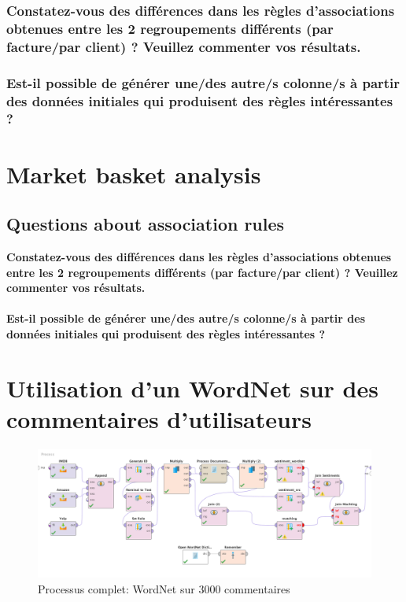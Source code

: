 \documentclass[a4paper]{article}
\begin{document}
\subsubsection*{Constatez-vous des différences dans les règles d'associations obtenues entre les 2 regroupements différents (par facture/par client) ? Veuillez commenter vos résultats.}

\subsubsection*{Est-il possible de générer une/des autre/s colonne/s à partir des données initiales qui produisent des règles intéressantes ?}
\section{Market basket analysis}
\subsection{Questions about association rules}
\textbf{Constatez-vous des différences dans les règles d'associations obtenues entre les 2 regroupements différents (par facture/par client) ? Veuillez commenter vos résultats.}
\\\\
\textbf{Est-il possible de générer une/des autre/s colonne/s à partir des données initiales qui produisent des règles intéressantes ?}

\section{Utilisation d'un WordNet sur des commentaires d’utilisateurs}

\begin{figure}[H]
	\includegraphics[width=\linewidth]{imgs/part_3/3_full_process}
	\caption{Processus complet: WordNet sur 3000 commentaires }
	\label{fig:3_full_process}
\end{figure}
\end{document}
